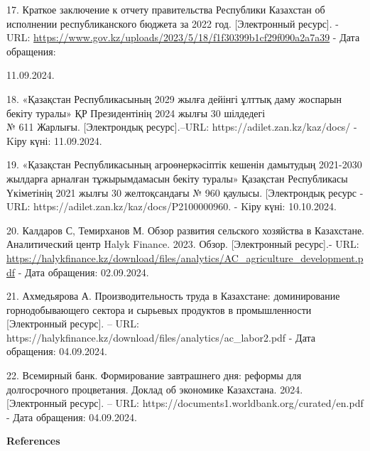 \begin{references}
17. Краткое заключение к отчету правительства Республики Казахстан об
исполнении республиканского бюджета за 2022 год. {[}Электронный
ресурс{]}. - URL:
\url{https://www.gov.kz/uploads/2023/5/18/f1f30399b1cf29f090a2a7a39} -
Дата обращения:

11.09.2024.

18. «Қазақстан Республикасының 2029 жылға дейінгі ұлттық даму жоспарын
бекіту туралы» ҚР Президентінің 2024 жылғы 30 шілдедегі\\
№ 611 Жарлығы. {[}Электрондық ресурс{]}.--URL:
https://adilet.zan.kz/kaz/docs/ - Kіру күні: 11.09.2024.

19. «Қазақстан Республикасының агроөнеркәсіптік кешенін дамытудың
2021-2030 жылдарға арналған тұжырымдамасын бекіту туралы» Қазақстан
Республикасы Үкіметінің 2021 жылғы 30 желтоқсандағы № 960 қаулысы.
{[}Электрондық ресурс - URL: https://adilet.zan.kz/kaz/docs/P2100000960.
- Kіру күні: 10.10.2024.

20. Калдаров С, Темирханов М. Обзор развития сельского хозяйства в
Казахстане. Аналитический центр Halyk Finance. 2023. Обзор.
{[}Электронный ресурс{]}.- URL:
\url{https://halykfinance.kz/download/files/analytics/AC_agriculture_development.pdf}
- Дата обращения: 02.09.2024.

21. Ахмедьярова А. Производительность труда в Казахстане: доминирование
горнодобывающего сектора и сырьевых продуктов в промышленности
{[}Электронный ресурс{]}. -- URL:
https://halykfinance.kz/download/files/analytics/ac\_labor2.pdf - Дата
обращения: 04.09.2024.

22. Всемирный банк. Формирование завтрашнего дня: реформы для
долгосрочного процветания. Доклад об экономике Казахстана. 2024.
{[}Электронный ресурс{]}. -- URL:
https://documents1.worldbank.org/curated/en.pdf - Дата обращения:
04.09.2024.
\end{references}

\begin{center}
{\bfseries References}
\end{center}

